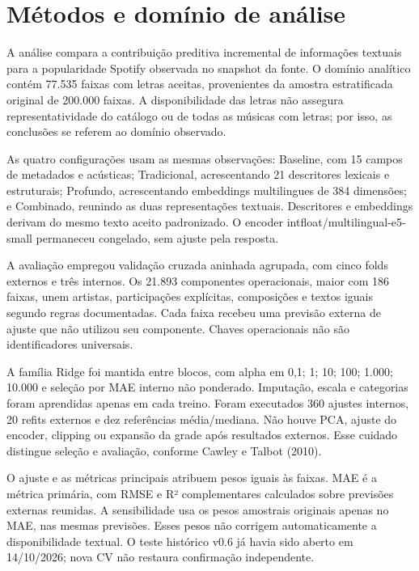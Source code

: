 \section{Métodos e domínio de análise}

A análise compara a contribuição preditiva incremental de informações textuais para a popularidade Spotify observada no snapshot da fonte. O domínio analítico contém 77.535 faixas com letras aceitas, provenientes da amostra estratificada original de 200.000 faixas. A disponibilidade das letras não assegura representatividade do catálogo ou de todas as músicas com letras; por isso, as conclusões se referem ao domínio observado.


As quatro configurações usam as mesmas observações: Baseline, com 15 campos de metadados e acústicas; Tradicional, acrescentando 21 descritores lexicais e estruturais; Profundo, acrescentando embeddings multilingues de 384 dimensões; e Combinado, reunindo as duas representações textuais. Descritores e embeddings derivam do mesmo texto aceito padronizado. O encoder intfloat/multilingual-e5-small permaneceu congelado, sem ajuste pela resposta.


A avaliação empregou validação cruzada aninhada agrupada, com cinco folds externos e três internos. Os 21.893 componentes operacionais, maior com 186 faixas, unem artistas, participações explícitas, composições e textos iguais segundo regras documentadas. Cada faixa recebeu uma previsão externa de ajuste que não utilizou seu componente. Chaves operacionais não são identificadores universais.


A família Ridge foi mantida entre blocos, com alpha em 0,1; 1; 10; 100; 1.000; 10.000 e seleção por MAE interno não ponderado. Imputação, escala e categorias foram aprendidas apenas em cada treino. Foram executados 360 ajustes internos, 20 refits externos e dez referências média/mediana. Não houve PCA, ajuste do encoder, clipping ou expansão da grade após resultados externos. Esse cuidado distingue seleção e avaliação, conforme Cawley e Talbot (2010).


O ajuste e as métricas principais atribuem pesos iguais às faixas. MAE é a métrica primária, com RMSE e R² complementares calculados sobre previsões externas reunidas. A sensibilidade usa os pesos amostrais originais apenas no MAE, nas mesmas previsões. Esses pesos não corrigem automaticamente a disponibilidade textual. O teste histórico v0.6 já havia sido aberto em 14/10/2026; nova CV não restaura confirmação independente.


